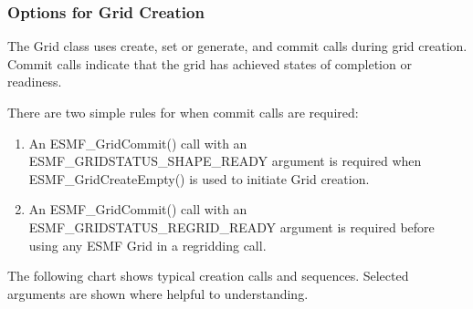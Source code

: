 \subsubsection{Options for Grid Creation}

The Grid class uses create, set or generate, and 
commit calls during grid creation.  Commit calls indicate
that the grid has achieved states of completion or readiness.

There are two simple rules for when commit calls are required:
\begin{enumerate}
\item An ESMF\_GridCommit() call with an ESMF\_GRIDSTATUS\_SHAPE\_READY
argument is required when ESMF\_GridCreateEmpty() is used to initiate
Grid creation.
\item An ESMF\_GridCommit() call with an ESMF\_GRIDSTATUS\_REGRID\_READY
argument is required before using any ESMF Grid in a regridding call.
\end{enumerate}

The following chart shows typical creation calls and 
sequences.  Selected arguments are shown where helpful
to understanding.

